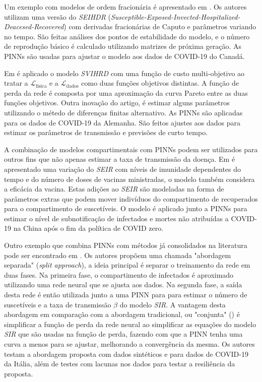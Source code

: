 Um exemplo com modelos de ordem fracionária é apresentado em 
\cite{li-etal:25-ordem-fracionaria}. Os autores utilizam uma versão do 
\textit{SEIHDR} (\textit{Susceptible-Exposed-Invected-Hospitalized-Deacesed-Recovered}) 
com derivadas fracionárias de Caputo e parâmetros variando no tempo.
São feitas análises dos pontos de estabilidade do modelo, e o número de reprodução
básico é calculado utilizando matrizes de próxima geração. 
As PINNs são usadas para ajustar o modelo aos dados de COVID-19 do Canadá.

Em \cite{heldmann-etal:23-biobjective-opt} é aplicado o modelo \textit{SVIHRD}
com uma função de custo multi-objetivo ao tratar a $\mathcal{L}_{\text{física}}$
e a $\mathcal{L}_{\text{dados}}$ como duas funções objetivos distintas.
A função de perda da rede é composta por uma aproximação da curva Pareto entre 
as duas funções objetivos.
Outra inovação do artigo, é estimar alguns parâmetros utilizando o métedo de 
diferenças finitas alternativo. 
As PINNs são aplicadas para os dados de COVID-19 da Alemanha. São feitos ajustes
aos dados para estimar os parâmetros de transmissão e previsões de curto tempo.  

A combinação de modelos compartimentais com PINNs podem ser utilizados para 
outros fins que não apenas estimar a taxa de transmissão da doença.
Em \cite{ghosh-etal:23-subnotificacao} é apresentado uma variação do \textit{SEIR}
com níveis de imunidade dependentes do tempo e do número de doses de vacinas 
ministradas, o modelo também considera a eficácia da vacina. 
Estas adições ao \textit{SEIR} são modeladas na forma de parâmetros extras que 
podem mover indivíduos do compartimento de recuperados para o compartimento de
suscetíveis.
O modelo é aplicado junto a PINNs para estimar o nível de subnotificação de 
infectados e mortes não atribuídas a COVID-19 na China após o fim da política 
de COVID zero.

Outro exemplo que combina PINNs com métodos já consolidados na literatura
pode ser encontrado em \cite{millevoi-etal:24-split-join-pinns}.
Os autores propõem uma chamada "abordagem separada" (\textit{split approach}),
a ideia principal é separar o treinamento da rede em duas fases. Na primeira 
fase, o compartimento de infectados é aproximado utilizando uma rede neural
que se ajusta aos dados. Na segunda fase, a saída desta rede é então utilizada
junto a uma PINN para para estimar o número de suscetíveis e a taxa de transmissão
$\beta$ do modelo \textit{SIR}. A vantagem desta abordagem em comparação com a
abordagem tradicional, ou "conjunta" () é simplificar a 
função de perda da rede neural ao simplificar as equações do modelo \textit{SIR}
que são usadas na função de perda, fazendo com que a PINN tenha uma curva a menos 
para se ajustar, melhorando a convergência da mesma. Os autores
testam a abordagem proposta com dados sintéticos e para dados de COVID-19 da Itália,
além de testes com lacunas nos dados para testar a resiliência da proposta. 

